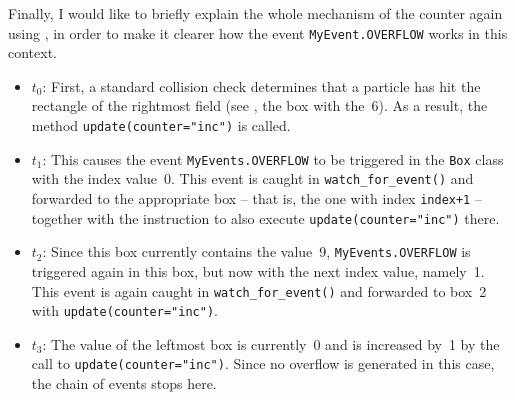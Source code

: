 Finally, I would like to briefly explain the whole mechanism of the counter again using , in order to make it clearer how the event \texttt{MyEvent.OVER\-FLOW} works in this context.

\begin{itemize}
	\item $t_0$: First, a standard collision check determines that a particle has hit the rectangle of the rightmost field (see , the box with the~6). As a result, the method \verb+update(counter="inc")+ is called.
	
	\item $t_1$: This causes the event \texttt{MyEvents.OVERFLOW} to be triggered in the \texttt{Box} class with the index value~0. This event is caught in \texttt{watch\_for\_event()} and forwarded to the appropriate box -- that is, the one with index \texttt{index+1} -- together with the instruction to also execute \verb+update(counter="inc")+ there.
	
	\item $t_2$: Since this box currently contains the value~9, \texttt{MyEvents.OVERFLOW} is triggered again in this box, but now with the next index value, namely~1. This event is again caught in \texttt{watch\_for\_event()} and forwarded to box~2 with \verb+update(counter="inc")+.
	
	\item $t_3$: The value of the leftmost box is currently~0 and is increased by~1 by the call to \verb+update(counter="inc")+. Since no overflow is generated in this case, the chain of events stops here.
\end{itemize}


